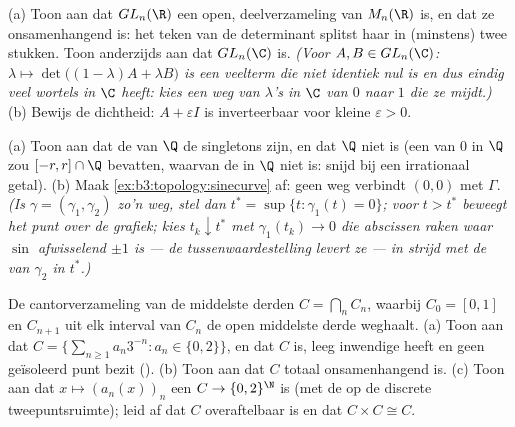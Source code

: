 \begin{exercise}[$\star\star$]\label{exo:b3:topology:8}
(a) Toon aan dat $GL_n(\R)$ een open,  deelverzameling van
$M_n(\R)$ is, en dat ze onsamenhangend is: het teken van de
determinant splitst haar in (minstens) twee stukken. Toon
anderzijds aan dat $GL_n(\C)$  is. \emph{(Voor $A,
B \in GL_n(\C)$: $\lambda \mapsto \det\bigl((1 - \lambda)A +
\lambda B\bigr)$ is een veelterm die niet identiek nul is en dus
eindig veel wortels in $\C$ heeft: kies een weg van $\lambda$'s in
$\C$ van $0$ naar $1$ die ze mijdt.)}
(b) Bewijs de dichtheid: $A + \varepsilon I$ is inverteerbaar voor
kleine $\varepsilon > 0$.
\end{exercise}

\begin{exercise}[$\star\star$]\label{exo:b3:topology:9}
(a) Toon aan dat de  van $\Q$ de singletons
zijn, en dat $\Q$ niet  is (een  
van $0$ in $\Q$ zou $[-r, r]\cap\Q$ bevatten, waarvan de
 in $\Q$ niet  is: snijd bij een irrationaal
getal).
(b) Maak \cref{ex:b3:topology:sinecurve} af: geen weg verbindt
$(0,0)$ met $\Gamma$. \emph{(Is $\gamma = (\gamma_1, \gamma_2)$
zo'n weg, stel dan $t^* = \sup\{t : \gamma_1(t) = 0\}$; voor $t >
t^*$ beweegt het punt over de grafiek; kies $t_k \downarrow t^*$
met $\gamma_1(t_k) \to 0$ die abscissen raken waar $\sin$
afwisselend $\pm1$ is --- de tussenwaardestelling levert ze ---
in strijd met de  van $\gamma_2$ in $t^*$.)}
\end{exercise}

\begin{exercise}[$\star\star\star$]\label{exo:b3:topology:10}
De cantorverzameling van de middelste derden $C = \bigcap_n C_n$,
waarbij $C_0 = [0,1]$ en $C_{n+1}$ uit elk interval van $C_n$ de
open middelste derde weghaalt.
(a) Toon aan dat $C = \bigl\{\sum_{n\geq1} a_n3^{-n} : a_n \in
\{0,2\}\bigr\}$, en dat $C$  is, leeg inwendige heeft en
geen geïsoleerd punt bezit (\emph{}).
(b) Toon aan dat $C$ totaal onsamenhangend is.
(c) Toon aan dat $x \mapsto (a_n(x))_n$ een  $C \to
\{0,2\}^\N$ is (met de  op de discrete
tweepuntsruimte); leid af dat $C$ overaftelbaar is en dat $C
\times C \cong C$.
\end{exercise}

